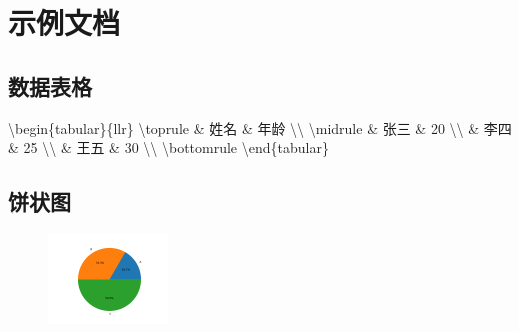 \documentclass{article}%
\begin{document}
%
\normalsize%
\section{示例文档}%
\label{sec:}%

%
\subsection{数据表格}%
\label{subsec:}%
\textbackslash{}begin\{tabular\}\{llr\}\newline%
\textbackslash{}toprule\newline%
 \& 姓名 \& 年龄 \textbackslash{}\textbackslash{}\newline%
\textbackslash{}midrule \& 张三 \& 20 \textbackslash{}\textbackslash{} \& 李四 \& 25 \textbackslash{}\textbackslash{} \& 王五 \& 30 \textbackslash{}\textbackslash{}\newline%
\textbackslash{}bottomrule\newline%
\textbackslash{}end\{tabular\}\newline%

%
\subsection{饼状图}%
\label{subsec:}%


\begin{figure}%
\centering%
\includegraphics[width=120px]{pie_chart.pdf}%
\end{figure}

%
\end{document}
